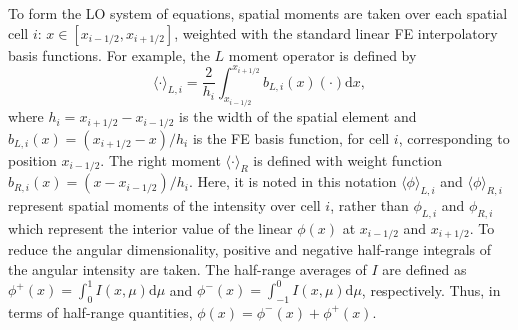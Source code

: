 \documentclass{mc2013}
\renewcommand{\d}{\mathrm{d}}
\newcommand{\mom}[1]{\langle #1 \rangle}
\newcommand{\xr}{{x_{i+1/2}}}
\newcommand{\il}{{i-1/2}}
\newcommand{\ir}{{i+1/2}}
\begin{document}

To form the LO system of equations, spatial moments are taken over each spatial cell $i$:
$x\in[x_{i-1/2},x_{i+1/2}]$, weighted with the standard linear FE
interpolatory basis functions.  For example, the $L$  moment operator is defined by
\begin{equation}\label{x_mom}
\mom{\cdot}_{L,i} = \frac{2}{h_i} \int_{x_{i-1/2}}^{\xr} b_{L,i}(x) (\cdot) \d x,
\end{equation}
where $h_i=x_{i+1/2}-x_{i-1/2}$ is the width of the spatial element and
$b_{L,i}(x)=(x_{i+1/2}-x)/h_i$ is the FE basis function, for cell $i$, corresponding to position
$x_{i-1/2}$.  The right moment $\mom{\cdot}_R$ is defined with weight function $b_{R,i}(x)=(x -
x_{i-1/2})/h_i$. Here, it is noted in this notation $\mom{\phi}_{L,i}$ and
$\mom{\phi}_{R,i}$ represent spatial moments of the intensity over cell $i$, rather
than $\phi_{L,i}$ and $\phi_{R,i}$ which represent the interior value of the linear
$\phi(x)$ at $x_\il$ and $x_\ir$. To reduce the angular dimensionality, positive and
negative half-range integrals of the angular intensity are taken.  The half-range
averages of $I$ are defined as $ \phi^+(x) = \int_0^{1} I(x,\mu) \d \mu$ and $ \phi^-(x) = \int_{-1}^{0} I(x,\mu) \d
\mu$, respectively.  Thus, in terms of half-range quantities, $\phi(x) = \phi^-(x) +
\phi ^+(x)$.  

\end{document}
